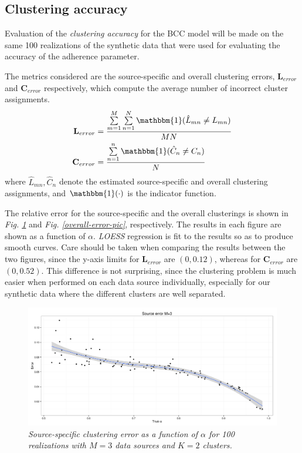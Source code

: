 \subsection{Clustering accuracy} \label{integr-synth-cluster-sect}
Evaluation of the \emph{clustering accuracy} for the BCC model will be made on the same 100 realizations of the synthetic data that were used for evaluating the accuracy of the adherence parameter.

The metrics considered are the source-specific and overall clustering errors, $\mathbf{L}_{error}$ and $\mathbf{C}_{error}$ respectively, which compute the average number of incorrect cluster assignments. 
\begin{equation}
  \begin{aligned}
  	\mathbf{L}_{error} & = \frac{\sum\limits_{m=1}^{M}\sum\limits_{n=1}^{N}\mathbbm{1}(\hat{L}_{mn} \neq L_{mn})}{MN} \\
  	\mathbf{C}_{error} & = \frac{\sum\limits_{n=1}^{n}\mathbbm{1}(\hat{C}_{n} \neq C_{n})}{N}
  \end{aligned}
\end{equation}
where $\hat{L}_{mn}, \hat{C}_{n}$ denote the estimated source-specific and overall clustering assignments, and $\mathbbm{1}(\cdot)$ is the indicator function.

The relative error for the source-specific and the overall clusterings is shown in \emph{Fig. \ref{source-error-pic}} and \emph{Fig. \ref{overall-error-pic}}, respectively. The results in each figure are shown as a function of $\alpha$. \emph{LOESS} regression \citep{Cleveland1979} is fit to the results so as to produce smooth curves. Care should be taken when comparing the results between the two figures, since the y-axis limits for $\mathbf{L}_{error}$ are $(0,0.12)$, whereas for $\mathbf{C}_{error}$ are $(0,0.52)$. This difference is not surprising, since the clustering problem is much easier when performed on each data source individually, especially for our synthetic data where the different clusters are well separated. 
\begin{figure}[!ht]
\begin{center}
 \includegraphics[scale = 0.39]{images/sourceError.png}
\caption{\emph{Source-specific clustering error as a function of $\alpha$ for 100 realizations with $M=3$ data sources and $K=2$ clusters.}}
\label{source-error-pic}
\end{center}
\end{figure}

